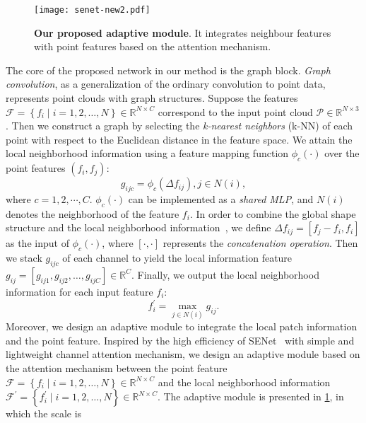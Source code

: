 \documentclass[runningheads]{llncs}
\begin{document}
 \begin{figure}[t]
  \centering
   \texttt{[image: senet-new2.pdf]}
   \caption{\textbf{Our proposed adaptive module}. It integrates neighbour features with point features based on the attention mechanism.}
   \label{fig:attention}
\end{figure}
 The core of the proposed network in our method is the graph block. \emph{Graph convolution}, as a generalization of the ordinary convolution to point data,  represents point clouds with graph structures. Suppose the features $\mathcal{F}=\left\{f_{i} \mid i=1,2, \ldots, N\right\} \in \mathbb{R}^{N \times C}$ correspond to the input point cloud  $\mathcal{P} \in \mathbb{R}^{N \times 3}$. Then we construct a graph by selecting the \textit{k-nearest neighbors} (k-NN) of each point with respect to the Euclidean distance in the feature space. We attain the local neighborhood information using a feature mapping function $\phi_{c}(\cdot)$ over the point features $\left(f_{i}, f_{j}\right)$:
\begin{equation}
g_{i j c}=\phi_{c}\left(\Delta f_{i j}\right), j \in N(i),   
\end{equation}
where $c = 1, 2,\cdots, C$. $\phi_{c}(\cdot)$ can be implemented as a \emph{shared MLP}, and $N(i)$ denotes the neighborhood of the feature $f_i$.
In order to combine the global shape structure and
the local neighborhood information~\cite{wang2019dynamic}, we define $\Delta f_{i j}=\left[f_{j}-f_{i}, f_{i}\right]$ as the input of $\phi_{c}(\cdot)$, where $\left[\cdot , \cdot \right]$ represents the \emph{concatenation operation}. Then we stack  $g_{ijc}$ of each channel to yield the local information feature $g_{i j}= \left[g_{i j 1}, g_{i j 2}, \ldots, g_{i j C}\right] \in \mathbb{R}^{C}$. Finally, we output the local neighborhood information for each input feature $f_{i}$:
\begin{equation}
f_{i}^{\prime}=\max _{j \in {N}(i)} g_{i j}.
\end{equation}
Moreover, we design an adaptive module to integrate the local patch information and the point feature. Inspired by the high efficiency of SENet~\cite{hu2018squeeze} with simple and lightweight channel attention mechanism, we design an adaptive module based on the attention mechanism between the point feature $\mathcal{F}=\left\{f_{i} \mid i=1,2, \ldots, N\right\} \in \mathbb{R}^{N \times C}$ and the local neighborhood information $\mathcal{F}^{\prime}=\left\{f_{i}^{\prime}\mid i=1,2, \ldots, N\right\} \in \mathbb{R}^{N \times C}$. The adaptive module is presented in \cref{fig:attention},  in which the scale is
\end{document}
